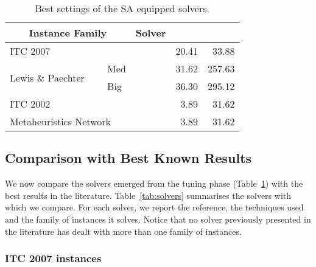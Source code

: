 \documentclass[authoryear,preprint,a4paper,12pt]{elsarticle}
\begin{document}
\begin{table}
\centering
\footnotesize
\begin{tabular}{|r@{}l|l|r|r|}\hline
\multicolumn{2}{|c|}{Instance Family} & \multicolumn{1}{c|}{Solver} & \multicolumn{1}{c|}{} & \multicolumn{1}{c|}{} \\ \hline
\multicolumn{2}{|l|}{ITC 2007} &  & 20.41  & 33.88 \\
 \multirow{2}{*}{Lewis \& Paechter}  &~~ Med  &  & 31.62 & 257.63 \\
 						     &~~ Big &  & 36.30 & 295.12 \\
\multicolumn{2}{|l|}{ITC 2002} & 	 & 3.89 &  31.62  \\
\multicolumn{2}{|l|}{Metaheuristics Network} &   & 3.89 & 31.62  \\
\hline
\end{tabular}
\caption{Best settings of the SA equipped solvers.}
\label{tab:comp_solvers}
\end{table}
\subsection{Comparison with Best Known Results}

We now compare the solvers emerged from the tuning phase
(Table~\ref{tab:comp_solvers}) with the best results in the
literature. Table~\ref{tab:solvers} summarises the solvers with which
we compare. For each solver, we report the reference, the techniques
used and the family of instances it solves. Notice that no solver previously presented in the literature has dealt with more than one family of instances.

\subsubsection{ITC 2007 instances}
\end{document}
